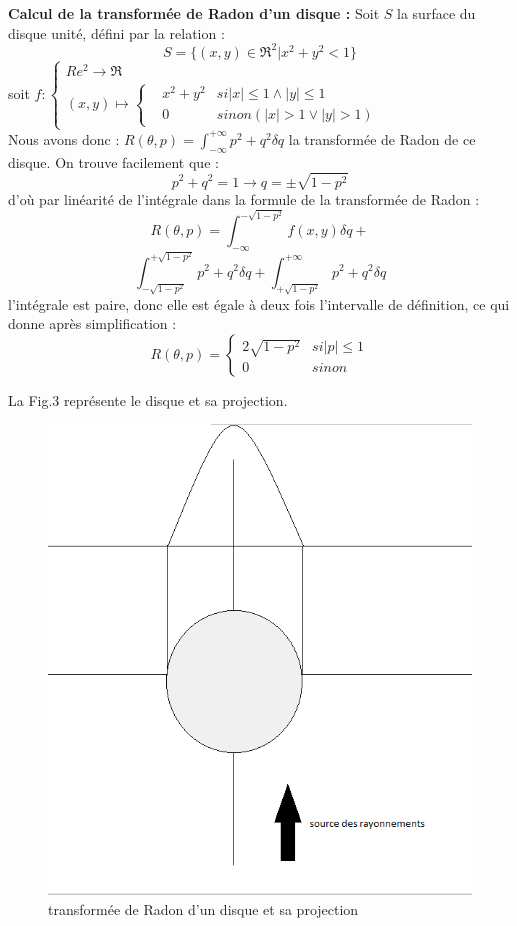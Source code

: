 \documentclass[conference]{IEEEtran}
\begin{document}
\textbf{Calcul de la transformée de Radon d'un disque : }
Soit $S$ la surface du disque unité, défini par la relation : \[S=\{(x,y)\in \Re^2|x^2+y^2<1\}\]
soit $f :\left\{\begin{array}{lcl}
Re^2 \to \Re \\
(x,y) \mapsto \left\{ \begin{array}{lcl}
&x^2+y^2 &si |x|\leq 1 \wedge |y|\leq 1 \\
&0 &sinon (|x|>1 \lor |y|>1)
\end{array}
\right.
\end{array}
\right.
$
\[\]
Nous avons donc : $R(\theta, p)=\int_{-\infty}^{+\infty} p^2+q^2 \delta q$ la transformée de Radon de ce disque. On trouve facilement que :
\[p^2+q^2=1 \rightarrow q=\pm \sqrt{1-p^2} \]
d'où par linéarité de l'intégrale dans la formule de la transformée de Radon :
\[R(\theta,p)=\int_{-\infty}^{-\sqrt{1-p^2}} f(x,y) \delta q + \]
\[ \int_{-\sqrt{1-p^2}}^{+\sqrt{1-p^2}} p^2+q^2 \delta q+\int_{+\sqrt{1-p^2}}^{+\infty} p^2+q^2 \delta q \]
l'intégrale est paire, donc elle est égale à deux fois l'intervalle de définition, ce qui donne après simplification :
\[R(\theta,p)= \left\{\begin{array}{lcl}
2\sqrt{1-p^2} & si |p| \leq 1 \\
0 & sinon
\end{array}
\right. \]

La Fig.3 représente le disque et sa projection.

\begin{figure}[H]
\centering
\includegraphics[scale=0.4]{transformeRadon}
\caption[transformée de Radon d'un disque et sa projection]{transformée de Radon d'un disque et sa projection}
\label{fig:gallery}
\end{figure}
\end{document}
